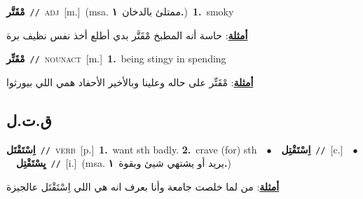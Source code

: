 \documentclass[10pt,a4paper,twoside]{article} %
\begin{document}
\begin{multicols}{2}
{\setlength\topsep{0pt}\textbf{\foreignlanguage{arabic}{مْقَتَّر}}\ {\color{gray}\texttt{//}\color{black}}\ \textsc{adj}\ [m.]\ \color{gray}(msa. \foreignlanguage{arabic}{ممتلئ بالدخان}~\foreignlanguage{arabic}{\textbf{١.}})\color{black}\ \textbf{1.}~smoky\  \begin{flushright}\color{gray}\foreignlanguage{arabic}{\textbf{\underline{\foreignlanguage{arabic}{أمثلة}}}: حاسة أنه المطبخ مْقَتَّر بدي أطلع أخذ نفس نظيف برة}\end{flushright}\color{black}} \vspace{2mm}

{\setlength\topsep{0pt}\textbf{\foreignlanguage{arabic}{مْقَتِّر}}\ {\color{gray}\texttt{//}\color{black}}\ \textsc{noun\textunderscore act}\ [m.]\ \textbf{1.}~being stingy in spending\  \begin{flushright}\color{gray}\foreignlanguage{arabic}{\textbf{\underline{\foreignlanguage{arabic}{أمثلة}}}: مْقَتِّر على حاله وعلينا وبالأخير الأحفاد همي اللي بيورثوا}\end{flushright}\color{black}} \vspace{2mm}

\vspace{-3mm}
\subsection*{\color{blue}\foreignlanguage{arabic}{ق.ت.ل}\color{blue}{}} 

{\setlength\topsep{0pt}\textbf{\foreignlanguage{arabic}{اِسْتَقْتَل}}\ {\color{gray}\texttt{//}\color{black}}\ \textsc{verb}\ [p.]\ \textbf{1.}~want sth badly.  \textbf{2.}~crave (for) sth\ \ $\bullet$\ \ \setlength\topsep{0pt}\textbf{\foreignlanguage{arabic}{اِسْتَقْتِل}}\ {\color{gray}\texttt{//}\color{black}}\ [c.]\ \ $\bullet$\ \ \setlength\topsep{0pt}\textbf{\foreignlanguage{arabic}{يِسْتَقْتِل}}\ {\color{gray}\texttt{//}\color{black}}\ [i.]\ \color{gray}(msa. \foreignlanguage{arabic}{يريد أو يشتهي شيئ وبقوة}~\foreignlanguage{arabic}{\textbf{١.}})\color{black}\  \begin{flushright}\color{gray}\foreignlanguage{arabic}{\textbf{\underline{\foreignlanguage{arabic}{أمثلة}}}: من لما خلصت جامعة وأنا بعرف انه هي اللي اِسْتَقْتَل عالجيزة}\end{flushright}\color{black}} \vspace{2mm}


\end{multicols}
\end{document}
